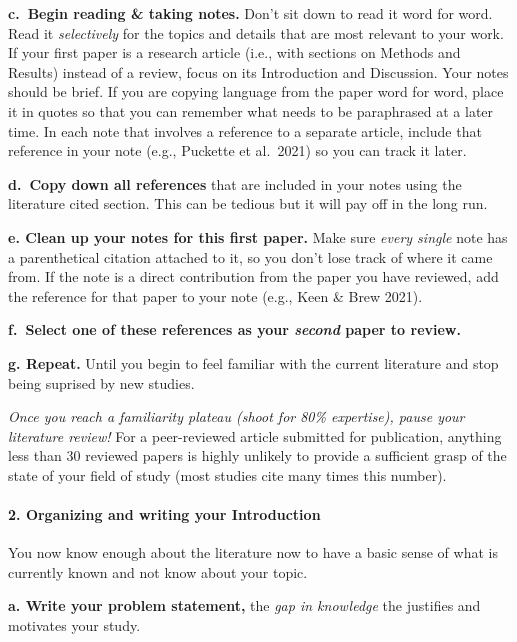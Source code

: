 \documentclass[
]{book}
\begin{document}
\textbf{c.~Begin reading \& taking notes.} Don't sit down to read it word for word. Read it \emph{selectively} for the topics and details that are most relevant to your work. If your first paper is a research article (i.e., with sections on Methods and Results) instead of a review, focus on its Introduction and Discussion. Your notes should be brief. If you are copying language from the paper word for word, place it in quotes so that you can remember what needs to be paraphrased at a later time. In each note that involves a reference to a separate article, include that reference in your note (e.g.,
Puckette et al.~2021) so you can track it later.

\textbf{d.~Copy down all references} that are included in your notes using the literature cited section. This can be tedious but it will pay off in the long run.

\textbf{e. Clean up your notes for this first paper.} Make sure \emph{every single} note has a parenthetical citation attached to it, so you don't lose track of where it came from. If the note is a direct contribution from the paper you have reviewed, add the reference for that paper to your note (e.g., Keen \& Brew 2021).

\textbf{f.~Select one of these references as your \emph{second} paper to review.}

\textbf{g. Repeat.} Until you begin to feel familiar with the current literature and stop being suprised by new studies.

\emph{Once you reach a familiarity plateau (shoot for 80\% expertise), pause your literature review!} For a peer-reviewed article submitted for publication, anything less than 30 reviewed papers is highly unlikely to provide a sufficient grasp of the state of your field of study (most studies cite many times this number).

\hypertarget{organizing-and-writing-your-introduction}{%
\paragraph{2. Organizing and writing your Introduction}\label{organizing-and-writing-your-introduction}}

You now know enough about the literature now to have a basic sense of what is currently known and not know about your topic.

\textbf{a. Write your problem statement,} the \emph{gap in knowledge} the justifies and motivates your study.
\end{document}
